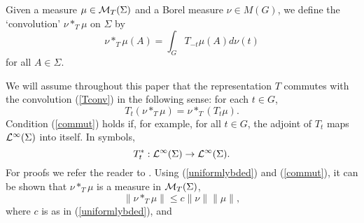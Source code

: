 \documentclass[12pt]{article}
\newcommand{\cL}{{\cal L}}
\newcommand{\cMT}{{\cal M}_T(\Sigma)}
\begin{document}
Given a measure $\mu\in \cMT$ and a Borel measure 
$\nu \in M(G)$, we define the `convolution' 
$\nu*_T\mu$ on $\Sigma$ by
\begin{equation}
\nu*_T\mu (A)=\int_G T_{-t}\mu(A) d\nu(t)
\label{Tconv}
\end{equation}
for all $A\in\Sigma$. 


We will assume throughout this paper
that the representation $T$ commutes with the 
convolution (\ref{Tconv}) in the following sense:
 for each $t\in G$, 
\begin{equation} 
 T_t(\nu*_T\mu)=\nu*_T(T_t\mu).
\label{commut}
\end{equation}
Condition (\ref{commut}) holds if, for example,
for all $t\in G$, the adjoint of $T_t$ maps 
$\cL^\infty(\Sigma)$ into itself.  In symbols,
\begin{equation}
T_t^*: \cL^\infty(\Sigma) \rightarrow \cL^\infty(\Sigma).
\label{adjointT}
\end{equation}
For proofs we refer the reader to 
\cite{ams2}.  Using (\ref{uniformlybded}) and 
(\ref{commut}), it can be shown that $\nu*_T\mu$ is a measure in $\cMT$,
\begin{equation}
\|\nu*_T\mu\|\leq  c\|\nu\|\|\mu\|,
\label{normofconv}
\end{equation}
where $c$ is as in 
(\ref{uniformlybded}), and 
\end{document}
